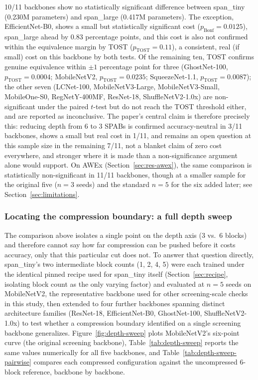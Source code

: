 \documentclass[11pt]{article}
\begin{document}
10/11 backbones show no statistically significant difference between span\_tiny (0.230M parameters) and span\_large (0.417M parameters). The exception, EfficientNet-B0, shows a small but statistically significant cost ($p_{\text{Bonf}}{=}0.0125$), span\_large ahead by 0.83 percentage points, and this cost is also not confirmed within the equivalence margin by TOST ($p_{\text{TOST}}{=}0.11$), a consistent, real (if small) cost on this backbone by both tests. Of the remaining ten, TOST confirms genuine equivalence within $\pm 1$ percentage point for three (GhostNet-100, $p_{\text{TOST}}{=}0.0004$; MobileNetV2, $p_{\text{TOST}}{=}0.0235$; SqueezeNet-1.1, $p_{\text{TOST}}{=}0.0087$); the other seven (LCNet-100, MobileNetV3-Large, MobileNetV3-Small, MobileOne-S0, RegNetY-400MF, ResNet-18, ShuffleNetV2-1.0x) are non-significant under the paired $t$-test but do not reach the TOST threshold either, and are reported as inconclusive. The paper's central claim is therefore precisely this: reducing depth from 6 to 3 SPABs is confirmed accuracy-neutral in 3/11 backbones, shows a small but real cost in 1/11, and remains an open question at this sample size in the remaining 7/11, not a blanket claim of zero cost everywhere, and stronger where it is made than a non-significance argument alone would support. On AWEx (Section~\ref{sec:res-awex}), the same comparison is statistically non-significant in 11/11 backbones, though at a smaller sample for the original five ($n=3$ seeds) and the standard $n=5$ for the six added later; see Section~\ref{sec:limitations}.

\subsubsection{Locating the compression boundary: a full depth sweep}
\label{sec:depth-sweep}

The comparison above isolates a single point on the depth axis (3 vs.\ 6 blocks) and therefore cannot say how far compression can be pushed before it costs accuracy, only that this particular cut does not. To answer that question directly, span\_tiny's two intermediate block counts (1, 2, 4, 5) were each trained under the identical pinned recipe used for span\_tiny itself (Section~\ref{sec:recipe}, isolating block count as the only varying factor) and evaluated at $n=5$ seeds on MobileNetV2, the representative backbone used for other screening-scale checks in this study, then extended to four further backbones spanning distinct architecture families (ResNet-18, EfficientNet-B0, GhostNet-100, ShuffleNetV2-1.0x) to test whether a compression boundary identified on a single screening backbone generalizes. Figure~\ref{fig:depth-sweep} plots MobileNetV2's six-point curve (the original screening backbone), Table~\ref{tab:depth-sweep} reports the same values numerically for all five backbones, and Table~\ref{tab:depth-sweep-pairwise} compares each compressed configuration against the uncompressed 6-block reference, backbone by backbone.
\end{document}
